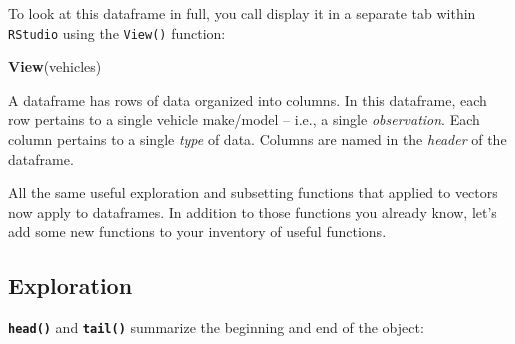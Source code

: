 \documentclass[
]{book}
\newenvironment{Shaded}{\begin{snugshade}}{\end{snugshade}}
\newcommand{\FunctionTok}[1]{\textcolor[rgb]{0.13,0.29,0.53}{\textbf{#1}}}
\newcommand{\NormalTok}[1]{#1}
\begin{document}
To look at this dataframe in full, you call display it in a separate tab within \texttt{RStudio} using the \texttt{View()} function:

\begin{Shaded}
\begin{Highlighting}[]
\FunctionTok{View}\NormalTok{(vehicles)}
\end{Highlighting}
\end{Shaded}

A dataframe has rows of data organized into columns. In this dataframe, each row pertains to a single vehicle make/model -- i.e., a single \emph{observation}. Each column pertains to a single \emph{type} of data. Columns are named in the \emph{header} of the dataframe.

All the same useful exploration and subsetting functions that applied to vectors now apply to dataframes. In addition to those functions you already know, let's add some new functions to your inventory of useful functions.

\subsection*{Exploration}\label{exploration}

\textbf{\texttt{head()}} and \textbf{\texttt{tail()}} summarize the beginning and end of the object:
\end{document}
